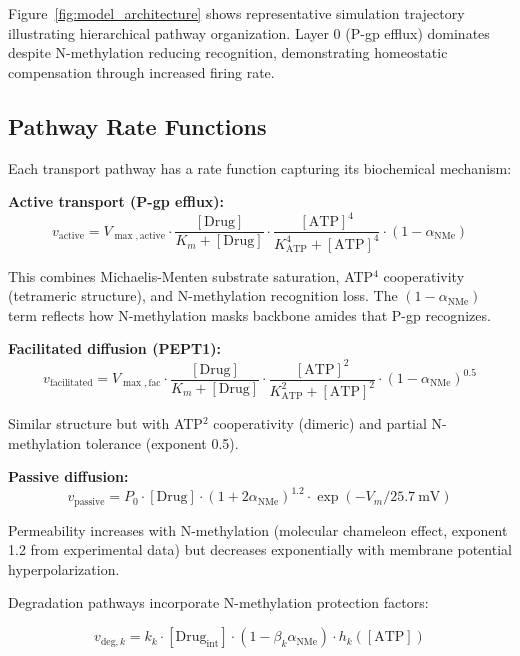 \documentclass[10pt,letterpaper]{article}
\begin{document}
Figure~\ref{fig:model_architecture} shows representative simulation trajectory illustrating hierarchical pathway organization. Layer 0 (P-gp efflux) dominates despite N-methylation reducing recognition, demonstrating homeostatic compensation through increased firing rate.

\subsection{Pathway Rate Functions}

Each transport pathway has a rate function capturing its biochemical mechanism:

\textbf{Active transport (P-gp efflux):}
\begin{equation}
\label{eq:active_transport}
v_{\text{active}} = V_{\max,\text{active}} \cdot \frac{[\text{Drug}]}{K_m + [\text{Drug}]} \cdot \frac{[\text{ATP}]^4}{K_{\text{ATP}}^4 + [\text{ATP}]^4} \cdot (1 - \alpha_{\text{NMe}})
\end{equation}

This combines Michaelis-Menten substrate saturation, ATP$^4$ cooperativity (tetrameric structure), and N-methylation recognition loss. The $(1-\alpha_{\text{NMe}})$ term reflects how N-methylation masks backbone amides that P-gp recognizes.

\textbf{Facilitated diffusion (PEPT1):}
\begin{equation}
\label{eq:facilitated_diffusion}
v_{\text{facilitated}} = V_{\max,\text{fac}} \cdot \frac{[\text{Drug}]}{K_m + [\text{Drug}]} \cdot \frac{[\text{ATP}]^2}{K_{\text{ATP}}^2 + [\text{ATP}]^2} \cdot (1 - \alpha_{\text{NMe}})^{0.5}
\end{equation}

Similar structure but with ATP$^2$ cooperativity (dimeric) and partial N-methylation tolerance (exponent 0.5).

\textbf{Passive diffusion:}
\begin{equation}
\label{eq:passive_diffusion}
v_{\text{passive}} = P_0 \cdot [\text{Drug}] \cdot (1 + 2\alpha_{\text{NMe}})^{1.2} \cdot \exp(-V_m/25.7~\text{mV})
\end{equation}

Permeability increases with N-methylation (molecular chameleon effect, exponent 1.2 from experimental data) but decreases exponentially with membrane potential hyperpolarization.

Degradation pathways incorporate N-methylation protection factors:

\begin{equation}
\label{eq:degradation}
v_{\text{deg},k} = k_k \cdot [\text{Drug}_{\text{int}}] \cdot (1 - \beta_k \alpha_{\text{NMe}}) \cdot h_k([\text{ATP}])
\end{equation}
\end{document}
